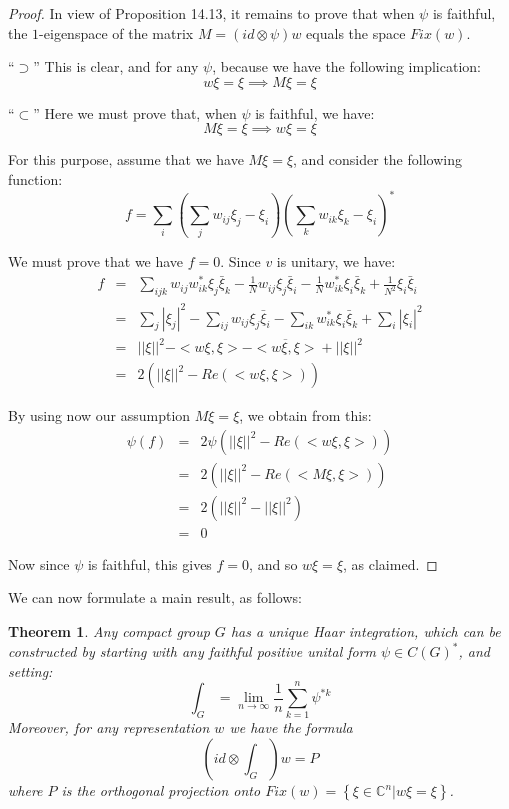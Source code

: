 \documentclass[12pt]{amsbook}
\newtheorem{theorem}{Theorem}[chapter]
\begin{document}
\begin{proof}
In view of Proposition 14.13, it remains to prove that when $\psi$ is faithful, the $1$-eigenspace of the matrix $M=(id\otimes\psi)w$ equals the space $Fix(w)$.

\medskip

``$\supset$'' This is clear, and for any $\psi$, because we have the following implication:
$$w\xi=\xi\implies M\xi=\xi$$

``$\subset$'' Here we must prove that, when $\psi$ is faithful, we have:
$$M\xi=\xi\implies w\xi=\xi$$

For this purpose, assume that we have $M\xi=\xi$, and consider the following function:
$$f=\sum_i\left(\sum_jw_{ij}\xi_j-\xi_i\right)\left(\sum_kw_{ik}\xi_k-\xi_i\right)^*$$

We must prove that we have $f=0$. Since $v$ is unitary, we have:
\begin{eqnarray*}
f
&=&\sum_{ijk}w_{ij}w_{ik}^*\xi_j\bar{\xi}_k-\frac{1}{N}w_{ij}\xi_j\bar{\xi}_i-\frac{1}{N}w_{ik}^*\xi_i\bar{\xi}_k+\frac{1}{N^2}\xi_i\bar{\xi}_i\\
&=&\sum_j|\xi_j|^2-\sum_{ij}w_{ij}\xi_j\bar{\xi}_i-\sum_{ik}w_{ik}^*\xi_i\bar{\xi}_k+\sum_i|\xi_i|^2\\
&=&||\xi||^2-<w\xi,\xi>-\overline{<w\xi,\xi>}+||\xi||^2\\
&=&2(||\xi||^2-Re(<w\xi,\xi>))
\end{eqnarray*}

By using now our assumption $M\xi=\xi$, we obtain from this:
\begin{eqnarray*}
\psi(f)
&=&2\psi(||\xi||^2-Re(<w\xi,\xi>))\\
&=&2(||\xi||^2-Re(<M\xi,\xi>))\\
&=&2(||\xi||^2-||\xi||^2)\\
&=&0
\end{eqnarray*}

Now since $\psi$ is faithful, this gives $f=0$, and so $w\xi=\xi$, as claimed.
\end{proof}

We can now formulate a main result, as follows:


\begin{theorem}
Any compact group $G$ has a unique Haar integration, which can be constructed by starting with any faithful positive unital form $\psi\in C(G)^*$, and setting:
$$\int_G=\lim_{n\to\infty}\frac{1}{n}\sum_{k=1}^n\psi^{*k}$$
Moreover, for any representation $w$ we have the formula
$$\left(id\otimes\int_G\right)w=P$$
where $P$ is the orthogonal projection onto $Fix(w)=\left\{\xi\in\mathbb C^n\big|w\xi=\xi\right\}$.
\end{theorem}
\end{document}
